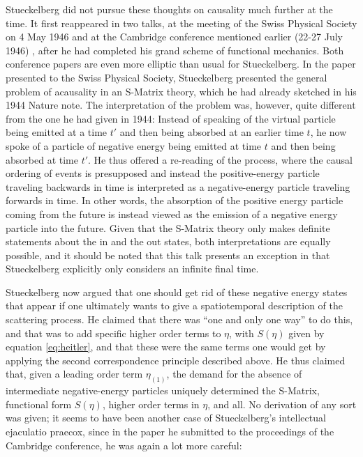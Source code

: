 \documentclass[12pt,a4paper]{article}
\begin{document}
Stueckelberg did not pursue these thoughts on causality much further at the time. It first reappeared  in two talks, at the meeting of the Swiss Physical Society on 4 May 1946 \citep{stueckelberg_1946_une-propriete} and at the Cambridge conference mentioned earlier (22-27 July 1946) \citep{stueckelberg_1947_the-present}, after he had completed his grand scheme of functional mechanics. Both conference papers are even more elliptic than usual for Stueckelberg. In the paper presented to the Swiss Physical Society, Stueckelberg presented the general problem of acausality in an S-Matrix theory, which he had already sketched in his 1944 Nature note. The interpretation of the problem was, however, quite different from the one he had given in 1944: Instead of speaking of the virtual particle being emitted at a time $t'$ and then being absorbed at an earlier time $t$, he now spoke of a particle of negative energy being emitted at time $t$ and then being absorbed at time $t'$. He thus offered a re-reading of the process, where the causal ordering of events is presupposed and instead the positive-energy particle traveling backwards in time is interpreted as a negative-energy particle traveling forwards in time. In other words, the absorption of the positive energy particle coming from the future is instead viewed as the emission of a negative energy particle into the future. Given that the S-Matrix theory only makes definite statements about the in and the out states, both interpretations are equally possible, and it should be noted that this talk presents an exception in that Stueckelberg explicitly only considers an infinite final time.

Stueckelberg now argued that one should get rid of these negative energy states that appear if one ultimately wants to give a spatiotemporal description of the scattering process. He claimed that there was ``one and only one way'' to do this, and that was to add specific higher order terms to $\eta$, with $S(\eta)$ given by equation \ref{eq:heitler}, and that these were the same terms one would get by applying the second correspondence principle described above. He thus claimed that, given a leading order term $\eta_{(1)}$, the demand for the absence of intermediate negative-energy particles uniquely determined the S-Matrix, functional form $S(\eta)$, higher order terms in $\eta$, and all. No derivation of any sort was given; it seems to have been another case of Stueckelberg's intellectual ejaculatio praecox, since in the paper he submitted to the proceedings of the Cambridge conference, he was again a lot more careful:
\end{document}
